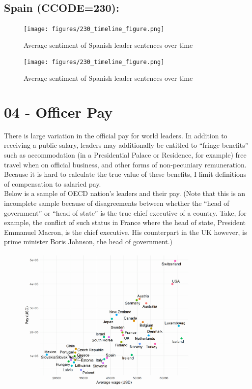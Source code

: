 \documentclass[11pt, letterpaper, twoside]{article}
\begin{document}
\subsection{Spain (CCODE=230):}
\begin{figure}
    \centering
    \texttt{[image: figures/230\_timeline\_figure.png]}
    \caption{Average sentiment of Spanish leader sentences over time}
\end{figure}

\begin{figure}
    \centering
    \texttt{[image: figures/230\_timeline\_figure.png]}
    \caption{Average sentiment of Spanish leader sentences over time}
\end{figure}






\section{04 - Officer Pay}
There is large variation in the official pay for world leaders. In addition to receiving a public salary, leaders may additionally be entitled to ``fringe benefits'' such as accommodation (in a Presidential Palace or Residence, for example) free travel when on official business, and other forms of non-pecuniary remuneration. Because it is hard to calculate the true value of these benefits, I limit definitions of compensation to salaried pay.\\

Below is a sample of OECD nation's leaders and their pay. (Note that this is an incomplete sample because of disagreements between whether the ``head of government'' or ``head of state'' is the true chief executive of a country. Take, for example, the conflict of such status in France where the head of state, President Emmanuel Macron, is the chief executive. His counterpart in the UK however, is prime minister Boris Johnson, the head of government.)

\begin{figure}
    \centering
    \includegraphics[clip, width=0.8\textwidth]{figures/leader_pay.png}

\end{figure}





\nocite{bell2016rulers}
\newpage


\newpage
\end{document}
